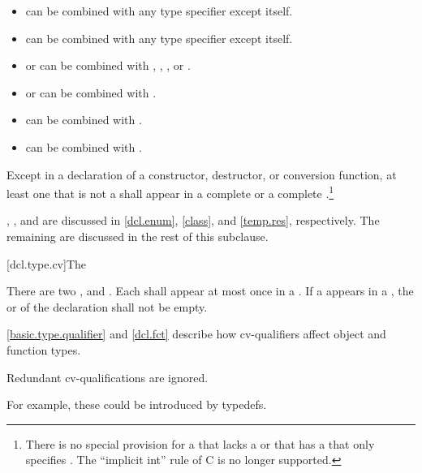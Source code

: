 \begin{itemize}
\item {} can be combined with any type specifier except itself.

\item {} can be combined with any type specifier except itself.

\item {} or  can be combined with
, , , or .

\item {} or  can be combined with .

\item {} can be combined with .

\item {} can be combined with .
\end{itemize}

\pnum
Except in a declaration of a constructor, destructor, or conversion
function, at least one  that is not a
 shall appear in a complete
 or a complete
.\footnote{There is no special
provision for a  that
lacks a  or that has a
 that only specifies .
The ``implicit int'' rule of C is no longer supported.}

\pnum
\begin{note}
,
,
and
are discussed
in
\ref{dcl.enum},
\ref{class},
and
\ref{temp.res}, respectively. The remaining
 are discussed in the rest of this subclause.
\end{note}

[dcl.type.cv]{The }%
%
%
%

\pnum
There are two ,  and
. Each  shall appear at most once in
a . If a  appears in a
, the 
or  of
the declaration shall not be empty.
\begin{note}
\ref{basic.type.qualifier} and \ref{dcl.fct} describe how cv-qualifiers affect object and
function types.
\end{note}
Redundant cv-qualifications are ignored. \begin{note} For example,
these could be introduced by typedefs.\end{note}

